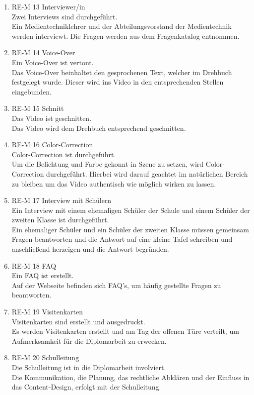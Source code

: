 \documentclass[
    headings=optiontotocandhead,%
    twoside,
    numbers=noenddot,%
    toc=flat, %
    12pt, %
    titlepage, %
    parskip=full, %
    listof=totoc, %
    listof=flat, %
    numbers=noenddot, %
    bibliography=totoc, %
    a4paper,DIV=14,
    BCOR=15mm,
]{scrbook}
\begin{document}
\begin{enumerate}
\item RE-M 13 Interviewer/in\\
Zwei Interviews sind durchgeführt.\\
Ein Medientechniklehrer und der Abteilungsvorstand der Medientechnik werden interviewt. Die Fragen werden aus dem Fragenkatalog entnommen.
\item RE-M 14 Voice-Over\\
Ein Voice-Over ist vertont.\\
Das Voice-Over beinhaltet den gesprochenen Text, welcher im Drehbuch festgelegt wurde. Dieser wird ins Video in den entsprechenden Stellen eingebunden.
\item RE-M 15 Schnitt \\
Das Video ist geschnitten.\\
Das Video wird dem Drehbuch entsprechend geschnitten.
\item RE-M 16 Color-Correction\\
Color-Correction ist durchgeführt.\\
Um die Belichtung und Farbe gekonnt in Szene zu setzen, wird Color-Correction durchgeführt. Hierbei wird darauf geachtet im natürlichen Bereich zu bleiben um das Video authentisch wie möglich wirken zu lassen.
\item RE-M 17 Interview mit Schülern\\
Ein Interview mit einem ehemaligen Schüler der Schule und einem Schüler der zweiten Klasse ist durchgeführt. \\
Ein ehemaliger Schüler und ein Schüler der zweiten Klasse müssen gemeinsam Fragen beantworten und die Antwort auf eine kleine Tafel schreiben und anschließend herzeigen und die Antwort begründen.
\item RE-M 18 FAQ\\
Ein FAQ ist erstellt.\\
Auf der Webseite befinden sich FAQ’s, um häufig gestellte Fragen zu beantworten.
\item RE-M 19 Visitenkarten\\
Visitenkarten sind erstellt und ausgedruckt.\\
Es werden Visitenkarten erstellt und am Tag der offenen Türe verteilt, um Aufmerksamkeit für die Diplomarbeit zu erwecken.
\item RE-M 20 Schulleitung \\
Die Schulleitung ist in die Diplomarbeit involviert.\\
Die Kommunikation, die Planung, das rechtliche Abklären und der Einfluss in das Content-Design, erfolgt mit der Schulleitung. 
\end{enumerate}
\end{document}
